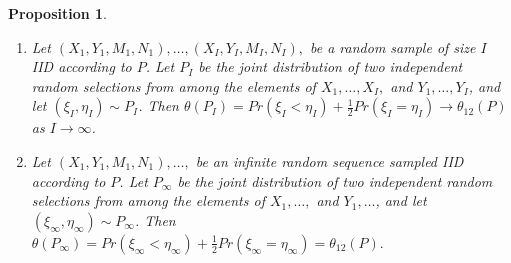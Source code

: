 \documentclass[12pt]{article}
\newcommand{\I}{I}
\newcommand{\E}{E}
\renewcommand{\P}{P}
\newcommand{\Kernel}{\psi}
\newcommand{\seqspace}{V}%
\newtheorem{proposition}[theorem]{Proposition}
\newtheorem{lemma}[theorem]{Lemma}
\begin{document}
\begin{proposition}
  \label{proposition:aucpop}
  \begin{enumerate}
  \item Let $(X_1,Y_1,M_1,N_1),\ldots,(X_\I,Y_\I,M_\I,N_\I),$
    be a random sample of size $\I$ IID according to $\P$. Let $\P_\I$ be
    the joint distribution of two independent random selections from
    among the elements of $X_1,\ldots,X_\I,$ and $Y_1,\ldots,Y_\I$, and
    let $(\xi_\I,\eta_\I)\sim\P_\I$. Then
    $\theta(\P_\I)=Pr(\xi_\I<\eta_\I)+\frac{1}{2}Pr(\xi_I=\eta_I) \to \theta_{12}(\P)$
    as $\I\to\infty$.
  \item Let $(X_1,Y_1,M_1,N_1),\ldots,$
    be an infinite random sequence sampled IID according to $\P$. Let $\P_\infty$ be
    the joint distribution of two independent random selections from
    among the elements of $X_1,\ldots,$ and $Y_1,\ldots$, and
    let $(\xi_\infty,\eta_\infty)\sim\P_\infty$. Then
    $\theta(\P_\infty)=Pr(\xi_\infty<\eta_\infty)+\frac{1}{2}Pr(\xi_\infty=\eta_\infty)=\theta_{12}(\P).$    
  \end{enumerate}
\end{proposition}
\end{document}
